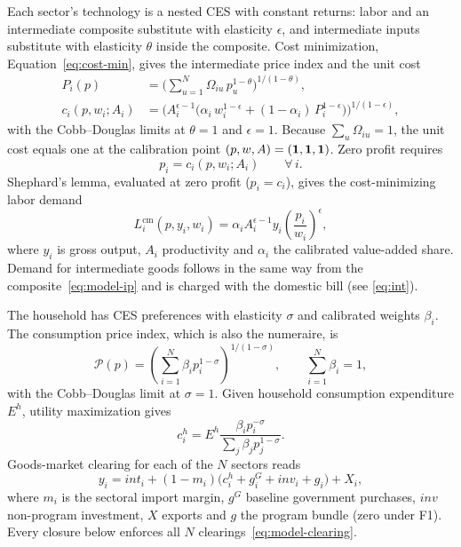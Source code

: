 Each sector's technology is a nested CES with constant returns: labor and an intermediate composite substitute with elasticity $\epsilon$, and intermediate inputs substitute with elasticity $\theta$ inside the composite. Cost minimization, Equation~\eqref{eq:cost-min}, gives the intermediate price index and the unit cost
\begin{align}
P_i(p) &= \Big(\textstyle\sum_{u=1}^N \Omega_{iu}\,p_u^{1-\theta}\Big)^{1/(1-\theta)},
\label{eq:model-ip}\\
c_i(p,w_i;A_i) &= \Big(A_i^{\epsilon-1}\big(\alpha_i\,w_i^{1-\epsilon}
  + (1-\alpha_i)\,P_i^{1-\epsilon}\big)\Big)^{1/(1-\epsilon)},
\label{eq:model-cost}
\end{align}
with the Cobb--Douglas limits at $\theta=1$ and $\epsilon=1$. Because
$\sum_u\Omega_{iu}=1$, the unit cost equals one at the calibration point
$(p,w,A)=(\mathbf{1},\mathbf{1},\mathbf{1})$. Zero profit requires
\begin{equation}
p_i = c_i(p,w_i;A_i) \qquad \forall\, i.
\label{eq:zp}
\end{equation}
Shephard's lemma, evaluated at zero profit ($p_i = c_i$), gives the
cost-minimizing labor demand
\begin{equation}
L_i^{\mathrm{cm}}(p,y_i,w_i)
 = \alpha_i A_i^{\epsilon-1} y_i
   \left(\frac{p_i}{w_i}\right)^{\epsilon},
\label{eq:closure-labour-demand}
\end{equation}
where $y_i$ is gross output, $A_i$ productivity and $\alpha_i$ the calibrated
value-added share. Demand for intermediate goods follows in the same way from the
composite~\eqref{eq:model-ip} and is charged with the domestic bill
(see \eqref{eq:int}).

The household has CES preferences with elasticity $\sigma$ and calibrated
weights $\beta_i$. The consumption price index, which is also the
numeraire, is
\begin{equation}
  \mathcal{P}(p) = \left(\sum_{i=1}^N \beta_i p_i^{1-\sigma}\right)^{1/(1-\sigma)},
  \qquad \sum_{i=1}^N \beta_i = 1,
  \label{eq:labour-cpi}
\end{equation}
with the Cobb--Douglas limit at $\sigma = 1$. Given household consumption
expenditure $E^h$, utility maximization gives
\begin{equation}
c_i^h = E^h\frac{\beta_i p_i^{-\sigma}}{\sum_j\beta_j p_j^{1-\sigma}}.
\label{eq:model-household}
\end{equation}
Goods-market clearing for each of the $N$ sectors reads
\begin{equation}
y_i = \mathit{int}_i + (1-m_i)\big(c_i^h + g_i^G + \mathit{inv}_i + g_i\big) + X_i,
\label{eq:model-clearing}
\end{equation}
where $m_i$ is the sectoral import margin, $g^G$ baseline government
purchases, $\mathit{inv}$ non-program investment, $X$ exports and $g$ the
program bundle (zero under F1). Every closure below enforces all $N$
clearings~\eqref{eq:model-clearing}.

